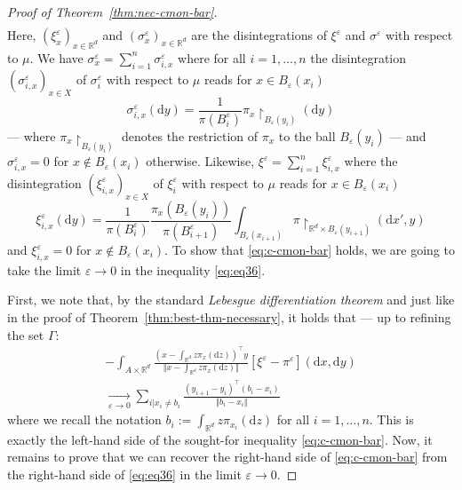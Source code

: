 \documentclass[10pt,a4paper]{amsart}
\newcommand{\R}{\mathbb{R}}
\newcommand{\dd}{\mathrm{d}}
\newcommand{\eps}{\varepsilon}
\begin{document}
\begin{proof}[Proof of Theorem~\ref{thm:nec-cmon-bar}]
\begin{multline}
	 \end{multline} 
     Here, $(\xi^\eps_x)_{x \in \R^d}$ and $(\sigma^\eps_x)_{x \in \R^d}$ are the disintegrations of $\xi^\eps$ and $\sigma^\eps$ with respect to $\mu$. We have $\sigma^\eps_{x} = \sum_{i=1}^n \sigma^\eps_{i, x}$ where for all $i = 1, \dots, n$ the disintegration $(\sigma^\eps_{i, x})_{x \in X}$ of $\sigma^\eps_i$ with respect to $\mu$ reads for $x \in B_\eps(x_i)$
	 \begin{equation}
	 	\sigma^\eps_{i, x}(\dd y)= \frac{1}{\pi(B_i^\eps)}\pi_{x}\restriction_{B_\eps(y_i)}(\dd y)
	\end{equation}
	--- where $\pi_{x}\restriction_{B_\eps(y_i)}$ denotes the restriction of $\pi_x$ to the ball $B_\eps(y_i)$ --- and $\sigma^{\eps}_{i, x} = 0$ for $x \notin B_\eps(x_i)$ otherwise. Likewise, $\xi^\eps = \sum_{i=1}^n \xi^\eps_{i, x}$ where the disintegration $(\xi^\eps_{i, x})_{x \in X}$ of $\xi^\eps_i$ with respect to $\mu$ reads for $x \in B_\eps(x_i)$
	\begin{equation}
		\xi^\eps_{i, x}(\dd y) = \frac{1}{\pi(B_i^\eps)} \frac{\pi_x(B_\eps(y_i))}{\pi(B_{i+1}^\eps)} \int_{B_\eps(x_{i+1})} \pi\restriction_{\R^d \times B_\eps(y_{i+1})}(\dd x', y)
	\end{equation}
    and $\xi^\eps_{i, x} = 0$ for $x \notin B_\eps(x_i)$. To show that \eqref{eq:c-cmon-bar} holds, we are going to take the limit $\eps \to 0$ in the inequality \eqref{eq:eq36}.
    
	 First, we note that, by the standard \textit{Lebesgue differentiation theorem} and just like in the proof of Theorem~\ref{thm:best-thm-necessary}, it holds that --- up to refining the set $\Gamma$:
	 \begin{multline}\label{eq:ldt-simple}
    -\int_{A \times \R^d} \frac{(x - \int_{\R^d} z \pi_x(\dd z))^\top y}{\Vert x - \int_{\R^d} z \pi_x(\dd z) \Vert} [\xi^\eps - \pi^\eps](\dd x, \dd y) \\ \xrightarrow[\eps \to 0]{} \sum_{i | x_i \neq b_i} \frac{(y_{i+1} - y_i)^\top (b_i - x_i)}{\Vert b_i - x_i \Vert}
	 \end{multline}
     where we recall the notation $b_i := \int_{\R^d} z \pi_{x_i}(\dd z)$ for all $i = 1, \dots, n$. This is exactly the left-hand side of the sought-for inequality \eqref{eq:c-cmon-bar}. Now, it remains to prove that we can recover the right-hand side of \eqref{eq:c-cmon-bar} from the right-hand side of \eqref{eq:eq36} in the limit $\eps \to 0$.
     

\end{proof}
\end{document}
